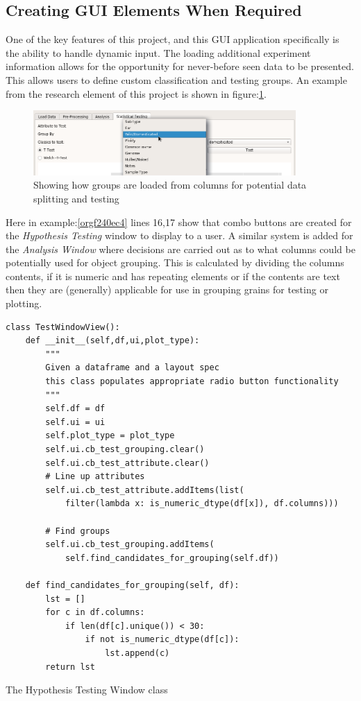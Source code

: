 \documentclass[11pt]{report}
\begin{document}
\subsection{Creating GUI Elements When Required}
\label{sec:orgeb5797b}

One of the key features of this project, and this GUI application specifically is the ability to handle dynamic input. The loading additional experiment information allows for the opportunity for never-before seen data to be presented. This allows users to define custom classification and testing groups. An example from the research element of this project is shown in figure:\ref{fig:org1ae37e3}.

\begin{figure}[htbp]
\centering
\includegraphics[width=10cm]{./images/dynamicselection.png}
\caption{\label{fig:org1ae37e3}
Showing how groups are loaded from columns for potential data splitting and testing}
\end{figure}

Here in example:\ref{orgf240ec4} lines 16,17 show that combo buttons are created for the \emph{Hypothesis Testing} window to display to a user. A similar system is added for the \emph{Analysis Window} where decisions are carried out as to what columns could be potentially used for object grouping. This is calculated by dividing the columns contents, if it is numeric and has repeating elements or if the contents are text then they are (generally) applicable for use in grouping grains for testing or plotting.

\begin{listing}[htbp]
\begin{verbatim}
class TestWindowView():
    def __init__(self,df,ui,plot_type):
        """
        Given a dataframe and a layout spec
        this class populates appropriate radio button functionality
        """
        self.df = df
        self.ui = ui
        self.plot_type = plot_type
        self.ui.cb_test_grouping.clear()
        self.ui.cb_test_attribute.clear()
        # Line up attributes
        self.ui.cb_test_attribute.addItems(list(
            filter(lambda x: is_numeric_dtype(df[x]), df.columns)))

        # Find groups
        self.ui.cb_test_grouping.addItems(
            self.find_candidates_for_grouping(self.df))

    def find_candidates_for_grouping(self, df):
        lst = []
        for c in df.columns:
            if len(df[c].unique()) < 30:
                if not is_numeric_dtype(df[c]):
                    lst.append(c)
        return lst
\end{verbatim}
\caption{\label{orgf240ec4}
The Hypothesis Testing Window class}
\end{listing}
\end{document}
